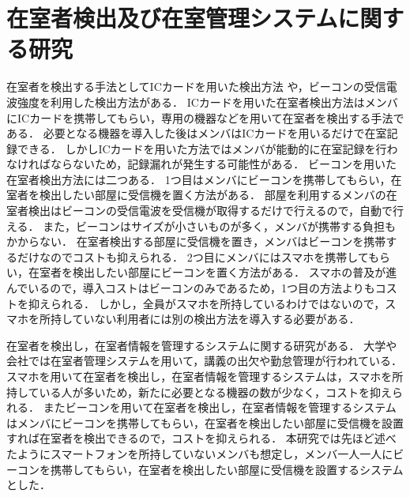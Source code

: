 \section{在室者検出及び在室管理システムに関する研究}\label{2.2}
在室者を検出する手法としてICカードを用いた検出方法
\cite{zyugyou}
\cite{felica}
\cite{densi}
\cite{notouchic}
\cite{felicaweb}
\cite{suica}
や，ビーコンの受信電波強度を利用した検出方法\cite{bledakoku}\cite{blesuitei}がある．
ICカードを用いた在室者検出方法はメンバにICカードを携帯してもらい，専用の機器などを用いて在室者を検出する手法である．
必要となる機器を導入した後はメンバはICカードを用いるだけで在室記録できる．
しかしICカードを用いた方法ではメンバが能動的に在室記録を行わなければならないため，記録漏れが発生する可能性がある．
ビーコンを用いた在室者検出方法には二つある．
1つ目はメンバにビーコンを携帯してもらい，在室者を検出したい部屋に受信機を置く方法がある．
部屋を利用するメンバの在室者検出はビーコンの受信電波を受信機が取得するだけで行えるので，自動で行える．
また，ビーコンはサイズが小さいものが多く，メンバが携帯する負担もかからない．
在室者検出する部屋に受信機を置き，メンバはビーコンを携帯するだけなのでコストも抑えられる．
2つ目にメンバにはスマホを携帯してもらい，在室者を検出したい部屋にビーコンを置く方法がある．
スマホの普及が進んでいる\cite{hukyu}ので，導入コストはビーコンのみであるため，1つ目の方法よりもコストを抑えられる．
しかし，全員がスマホを所持しているわけではないので，スマホを所持していない利用者には別の検出方法を導入する必要がある．

在室者を検出し，在室者情報を管理するシステムに関する研究がある\cite{smartphoneAndRoom}\cite{laboratory}\cite{prep}．
大学や会社では在室者管理システムを用いて，講義の出欠\cite{smartphone}\cite{nfcandroid}\cite{android}\cite{smartbase}\cite{garake}や勤怠管理\cite{amano}が行われている．
スマホを用いて在室者を検出し，在室者情報を管理するシステムは，スマホを所持している人が多いため，新たに必要となる機器の数が少なく，コストを抑えられる\cite{smartphoneAndRoom}．
またビーコンを用いて在室者を検出し，在室者情報を管理するシステムはメンバにビーコンを携帯してもらい，在室者を検出したい部屋に受信機を設置すれば在室者を検出できるので，コストを抑えられる\cite{laboratory}\cite{prep}．
本研究では先ほど述べたようにスマートフォンを所持していないメンバも想定し，メンバ一人一人にビーコンを携帯してもらい，在室者を検出したい部屋に受信機を設置するシステムとした．


